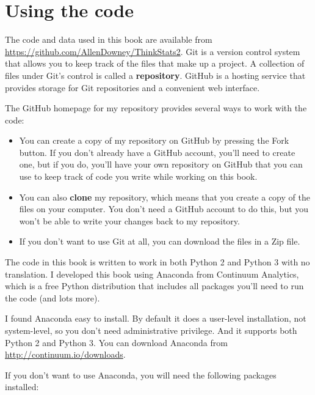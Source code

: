 \documentclass[12pt]{book}
\begin{document}
\section*{Using the code}
\label{code}


The code and data used in this book are available from
\url{https://github.com/AllenDowney/ThinkStats2}.  Git is a version
control system that allows you to keep track of the files that
make up a project.  A collection of files under Git's control is
called a {\bf repository}.  GitHub is a hosting service that provides
storage for Git repositories and a convenient web interface.

The GitHub homepage for my repository provides several ways to
work with the code:

\begin{itemize}

\item You can create a copy of my repository
on GitHub by pressing the {\sf Fork} button.  If you don't already
have a GitHub account, you'll need to create one, but if you do, you'll
have your own repository on GitHub that you can use to keep track
of code you write while working on this book.

\item You can also {\bf clone}
my repository, which means that you create a copy of the files on
your computer.  You don't need a GitHub account to do this, but you
won't be able to write your changes back to my repository.

\item If you don't want to use Git at all, you can download the files
in a Zip file.

\end{itemize}

The code in this book is written to work in both Python 2 and Python 3
with no translation.  
I developed this book using Anaconda from Continuum
Analytics, which is a free Python distribution that includes all
packages you'll need to run the code (and lots more).

I found Anaconda easy to install.  By default it does a user-level
installation, not system-level, so you don't need administrative
privilege.  And it supports both Python 2 and Python 3.  You can
download Anaconda from \url{http://continuum.io/downloads}.

If you don't want to use Anaconda, you will need the following
packages installed:
\end{document}
